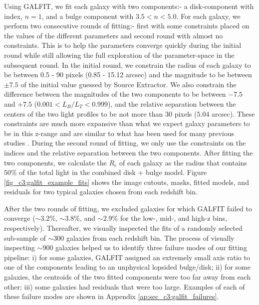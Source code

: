 Using GALFIT, we fit each galaxy with two \sersic{} components:- a disk-component with \sersic{} index, $n=1$, and a bulge component with $3.5 < n < 5.0$. For each galaxy, we perform two consecutive rounds of fitting:- first with some constraints placed on the values of the different parameters and second round with almost no constraints. This is to help the parameters converge quickly during the initial round while still allowing the full exploration of the parameter-space in the subsequent round. In the initial round, we constrain the radius of each galaxy to be between 0.5 - 90 pixels (0.85 - 15.12 arcsec) and the magnitude to be between $\pm7.5$ of the initial value guessed by Source Extractor. We also constrain the difference between the magnitudes of the two components to be between $-7.5$ and $+7.5$ ($0.001 < L_B/L_T < 0.999$), and the relative separation between the centers of the two light profiles to be not more than 30 pixels ($5.04$ arcsec). These constraints are much more expansive than what we expect galaxy parameters to be in this z-range and are similar to what has been used for many previous studies \citep[e.g.,][]{vdw_12,Tuccillo2018DeepFitting}. During the second round of fitting, we only use the constraints on the \sersic{} indices and the relative separation between the two components. After fitting the two components, we calculate the $R_e$ of each galaxy as the radius that contains $50\%$ of the total light in the combined disk + bulge model. Figure \ref{fig_c3:galfit_example_fits} shows the image cutouts, masks, fitted models, and residuals for two typical galaxies chosen from each redshift bin.

After the two rounds of fitting, we excluded galaxies for which GALFIT failed to converge ($\sim3.2\%$, $\sim3.8\%$, and $\sim2.9\%$ for the low-, mid-, and high-z bins, respectively). Thereafter, we visually inspected the fits of a randomly selected sub-sample of $\sim300$ galaxies from each redshift bin. The process of visually inspecting $\sim900$ galaxies helped us to identify three failure modes of our fitting pipeline: i) for some galaxies, GALFIT assigned an extremely small axis ratio to one of the components leading to an unphysical lopsided bulge/disk; ii) for some galaxies, the centroids of the two fitted components were too far away from each other; iii) some galaxies had residuals that were too large. Examples of each of these failure modes are shown in Appendix \ref{ap:sec_c3:galfit_failures}.

